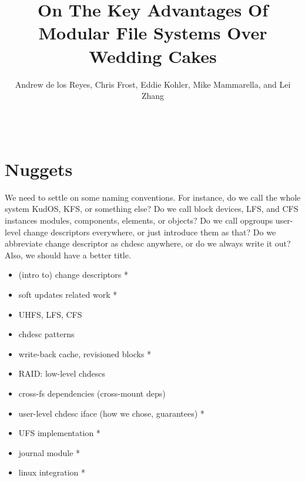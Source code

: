 \documentclass[10pt,twocolumn,letterpaper]{article}
\begin{document}
\normalsize

\title{\sffamily\textbf{On The Key Advantages Of Modular File Systems Over Wedding Cakes}}


\author{\sffamily Andrew de los Reyes, Chris Frost, Eddie Kohler, Mike
Mammarella, and Lei Zhang \\
\noalign{\vskip2pt}
 \\
\noalign{\vskip2pt}
 \\
\noalign{\vskip-.25in}
\null}
\date{}
\maketitle

\def\assast{\raise.2ex\hbox{$^\ast$}}



\section{Nuggets}

We need to settle on some naming conventions. For instance, do we call the whole
system KudOS, KFS, or something else? Do we call block devices, LFS, and CFS
instances modules, components, elements, or objects? Do we call opgroups
user-level change descriptors everywhere, or just introduce them as that? Do we
abbreviate change descriptor as chdesc anywhere, or do we always write it out?
Also, we should have a better title.

\begin{itemize}
\item (intro to) change descriptors *
\item soft updates related work *
\item UHFS, LFS, CFS
\item chdesc patterns
\item write-back cache, revisioned blocks *
\item RAID: low-level chdescs
\item cross-fs dependencies (cross-mount deps)
\item user-level chdesc iface (how we chose, guarantees) *
\item UFS implementation *
\item journal module *
\item linux integration *
\end{itemize}











\end{document}
